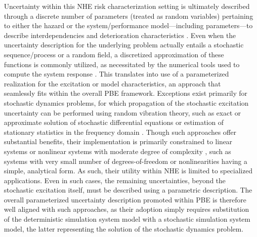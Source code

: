 Uncertainty within this NHE risk characterization setting is ultimately described through a discrete number of parameters (treated as random variables) pertaining to either the hazard or the system/performance model---including parameters---to describe interdependencies and deterioration characteristics \citep{jia2018statedependent, akiyama2020lifecycle}. Even when the uncertainty description for the underlying problem actually entails a stochastic sequence/process or a random field, a discretized approximation of these functions is commonly utilized, as necessitated by the numerical tools used to compute the system response \citep{gidaris2014surrogate}. This translates into use of a parameterized realization for the excitation or model characteristics, an approach that seamlessly fits within the overall PBE framework. Exceptions exist primarily for stochastic dynamics problems, for which propagation of the stochastic excitation uncertainty can be performed using random vibration theory, such as exact or approximate solution of stochastic differential equations or estimation of stationary statistics in the frequency domain \citep{li2009stochastic}. Though such approaches offer substantial benefits, their implementation is primarily constrained to linear systems or nonlinear systems with moderate degree of complexity \citep{dossantos2016incremental, wang2016tailequivalent}, such as systems with very small number of degrees-of-freedom or nonlinearities having a simple, analytical form. As such, their utility within NHE is limited to specialized applications. Even in such cases, the remaining uncertainties, beyond the stochastic excitation itself, must be described using a parametric description. The overall parameterized uncertainty description promoted within PBE is therefore well aligned with such approaches, as their adoption simply requires substitution of the deterministic simulation system model with a stochastic simulation system model, the latter representing the solution of the stochastic dynamics problem.


